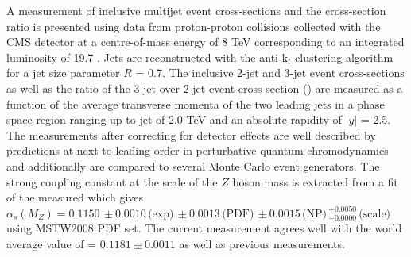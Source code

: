 A measurement of inclusive multijet event cross-sections and the cross-section ratio is presented using data from proton-proton collisions collected with the CMS detector at a centre-of-mass energy of 8 TeV corresponding to an integrated luminosity of 19.7 \fbinv. Jets are reconstructed with the anti-k$_t$ clustering algorithm for a jet size parameter $R$ = 0.7. The inclusive 2-jet and 3-jet event cross-sections as well as the ratio of the 3-jet over 2-jet event cross-section (\ratio) are measured as a function of the average transverse momenta \pt of the two leading jets in a phase space region ranging up to jet \pt of 2.0 TeV and an absolute rapidity of $|y|$ = 2.5. The measurements after correcting for detector effects are well described by predictions at next-to-leading order in perturbative quantum chromodynamics and additionally are compared to several Monte Carlo event generators. The strong coupling constant at the scale of the $Z$ boson mass is extracted from a fit of the measured \ratio which gives $\alpha_s(M_Z) = 0.1150\,\pm0.0010\,\textrm{(exp)}\,\pm0.0013\,\textrm{(PDF)}\, \pm0.0015\,\textrm{(NP)}\,^{+0.0050}_{-0.0000}\,\textrm{(scale)}$ using MSTW2008 PDF set. The current measurement agrees well with the world average value of \alpsmz = $0.1181 \pm 0.0011$ as well as previous measurements.
